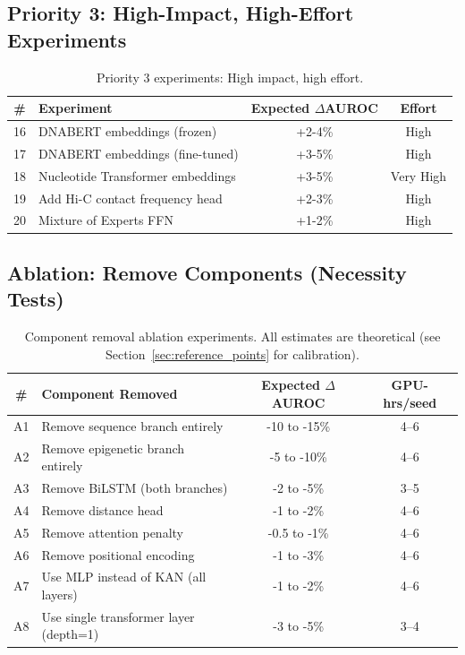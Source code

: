 \documentclass[11pt,a4paper]{article}
\begin{document}
\subsection{Priority 3: High-Impact, High-Effort Experiments}

\begin{table}[H]
\centering
\begin{tabular}{clcc}
\toprule
\textbf{\#} & \textbf{Experiment} & \textbf{Expected $\Delta$AUROC} & \textbf{Effort} \\
\midrule
16 & DNABERT embeddings (frozen) & +2-4\% & High \\
17 & DNABERT embeddings (fine-tuned) & +3-5\% & High \\
18 & Nucleotide Transformer embeddings & +3-5\% & Very High \\
19 & Add Hi-C contact frequency head & +2-3\% & High \\
20 & Mixture of Experts FFN & +1-2\% & High \\
\bottomrule
\end{tabular}
\caption{Priority 3 experiments: High impact, high effort.}
\end{table}

\subsection{Ablation: Remove Components (Necessity Tests)}
\label{sec:necessity_tests}

\begin{table}[H]
\centering
\begin{tabular}{clcc}
\toprule
\textbf{\#} & \textbf{Component Removed} & \textbf{Expected $\Delta$AUROC} & \textbf{GPU-hrs/seed} \\
\midrule
A1 & Remove sequence branch entirely & -10 to -15\% & 4--6 \\
A2 & Remove epigenetic branch entirely & -5 to -10\% & 4--6 \\
A3 & Remove BiLSTM (both branches) & -2 to -5\% & 3--5 \\
A4 & Remove distance head & -1 to -2\% & 4--6 \\
A5 & Remove attention penalty & -0.5 to -1\% & 4--6 \\
A6 & Remove positional encoding & -1 to -3\% & 4--6 \\
A7 & Use MLP instead of KAN (all layers) & -1 to -2\% & 4--6 \\
A8 & Use single transformer layer (depth=1) & -3 to -5\% & 3--4 \\
\bottomrule
\end{tabular}
\caption{Component removal ablation experiments. All estimates are theoretical (see Section~\ref{sec:reference_points} for calibration).}
\end{table}
\end{document}
